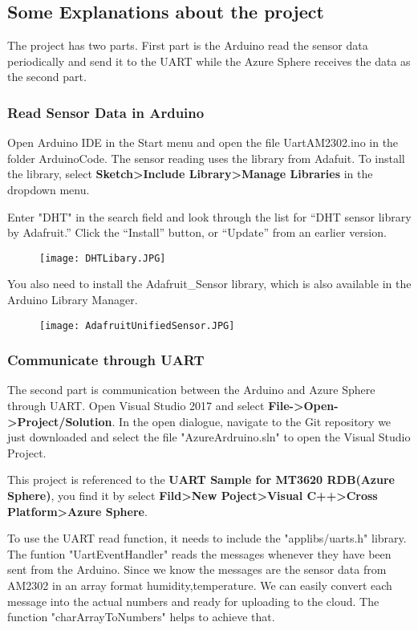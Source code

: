 \subsection{Some Explanations about the project}
The project has two parts. First part is the Arduino read the sensor data periodically and send it to the UART while the Azure Sphere receives the data as the second part.

\subsubsection{Read Sensor Data in Arduino}
Open Arduino IDE in the Start menu and open the file UartAM2302.ino in the folder ArduinoCode. The sensor reading uses the library from Adafuit. To install the library, select \textbf{Sketch>Include Library>Manage Libraries} in the dropdown menu. 

Enter "DHT" in the search field and look through the list for “DHT sensor library by Adafruit.” Click the “Install” button, or “Update” from an earlier version.
\begin{figure}[h]
    \texttt{[image: DHTLibary.JPG]}
\end{figure}

You also need to install the Adafruit\_Sensor library, which is also available in the Arduino Library Manager.
\begin{figure}[h]
    \texttt{[image: AdafruitUnifiedSensor.JPG]}
\end{figure}

\subsubsection{Communicate through UART}
The second part is communication between the Arduino and Azure Sphere through UART. Open Visual Studio 2017 and select \textbf{File->Open->Project/Solution}. In the open dialogue, navigate to the Git repository we just downloaded and select the file "AzureArdruino.sln" to open the Visual Studio Project.

This project is referenced to the \textbf{UART Sample for MT3620 RDB(Azure Sphere)}, you find it by select \textbf{Fild>New Poject>Visual C++>Cross Platform>Azure Sphere}.

To use the UART read function, it needs to include the "applibs/uarts.h" library. The funtion "UartEventHandler" reads the messages whenever they have been sent from the Arduino. Since we know the messages are the sensor data from AM2302 in an array format {humidity,temperature}. We can easily convert each message into the actual numbers and ready for uploading to the cloud. The function "charArrayToNumbers" helps to achieve that.

